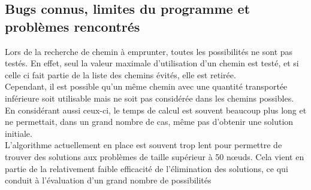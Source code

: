 \documentclass[a4paper, 12pt]{report}
\begin{document}
\subsection{Bugs connus, limites du programme et problèmes rencontrés}
Lors de la recherche de chemin à emprunter, toutes les possibilités ne sont pas testés.
En effet, seul la valeur maximale d'utilisation d'un chemin est testé, 
et si celle ci fait partie de la liste des chemins évités, elle est retirée. \\
Cependant, il est possible qu'un même chemin avec une quantité transportée inférieure
soit utilisable mais ne soit pas considérée dans les chemins possibles.\\
En considérant aussi ceux-ci, le temps de calcul est souvent beaucoup plus long et ne permettait,
dans un grand nombre de cas, même pas d'obtenir une solution initiale. \\ \hbox

L'algorithme actuellement en place est souvent trop lent pour permettre de trouver des solutions 
aux problèmes de taille supérieur à 50 nœuds. 
Cela vient en partie de la relativement faible efficacité de l'élimination des solutions, 
ce qui conduit à l'évaluation d'un grand nombre de possibilités
\end{document}
